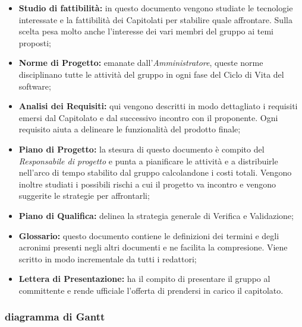 \begin{itemize}
\item \textbf{Studio di fattibilità:} in questo documento vengono studiate le tecnologie interessate e la fattibilità dei Capitolati per stabilire quale affrontare. Sulla scelta pesa molto anche l'interesse dei vari membri del gruppo ai temi proposti;
\item \textbf{Norme di Progetto:} emanate dall'\textit{Amministratore}, queste norme disciplinano tutte le attività del gruppo in ogni fase del Ciclo di Vita del software;
\item \textbf{Analisi dei Requisiti:} qui vengono descritti in modo dettagliato i requisiti emersi dal Capitolato e dal successivo incontro con il proponente. Ogni requisito aiuta a delineare le funzionalità del prodotto finale;
\item \textbf{Piano di Progetto:} la stesura di questo documento è compito del \textit{Responsabile di progetto} e punta a pianificare le attività e a distribuirle nell'arco di tempo stabilito dal gruppo calcolandone i costi totali. Vengono inoltre studiati i possibili rischi a cui il progetto va incontro e vengono suggerite le strategie per affrontarli;
\item \textbf{Piano di Qualifica:} delinea la strategia generale di Verifica e Validazione;
\item \textbf{Glossario:} questo documento contiene le definizioni dei termini e degli acronimi presenti negli altri documenti e ne facilita la compresione. Viene scritto in modo incrementale da tutti i redattori;
\item \textbf{Lettera di Presentazione:} ha il compito di presentare il gruppo al committente e rende ufficiale l'offerta di prendersi in carico il capitolato.
\end{itemize}

\newpage
\subsubsection{diagramma di Gantt}

